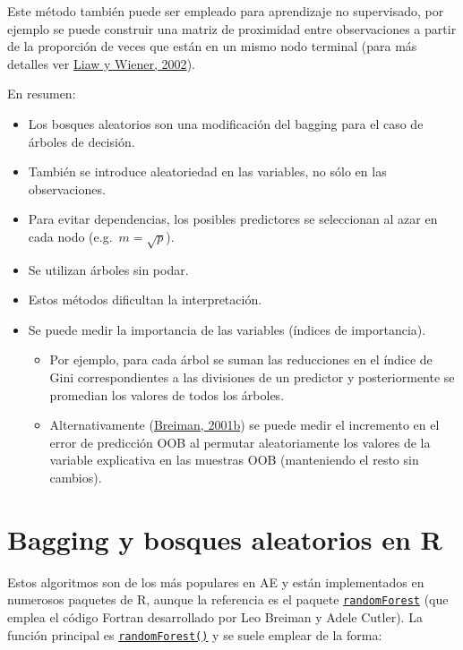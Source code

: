\documentclass[
]{book}
\theoremstyle{break}
\theoremstyle{nonumberplain}
\begin{document}
Este método también puede ser empleado para aprendizaje no supervisado,
por ejemplo se puede construir una matriz de proximidad entre observaciones a partir de la proporción de veces que están en un mismo nodo terminal (para más detalles ver \protect\hyperlink{ref-liaw2002classification}{Liaw y Wiener, 2002}).

En resumen:

\begin{itemize}
\item
  Los bosques aleatorios son una modificación del bagging para el caso de árboles de decisión.
\item
  También se introduce aleatoriedad en las variables, no sólo en las observaciones.
\item
  Para evitar dependencias, los posibles predictores se seleccionan al azar en cada nodo (e.g.~\(m=\sqrt{p}\)).
\item
  Se utilizan árboles sin podar.
\item
  Estos métodos dificultan la interpretación.
\item
  Se puede medir la importancia de las variables (índices de importancia).

  \begin{itemize}
  \item
    Por ejemplo, para cada árbol se suman las reducciones en el
    índice de Gini correspondientes a las divisiones de un
    predictor y posteriormente se promedian los valores de todos
    los árboles.
  \item
    Alternativamente (\protect\hyperlink{ref-breiman2001statistical}{Breiman, 2001b}) se puede medir el incremento en el error de
    predicción OOB al permutar aleatoriamente los valores de la
    variable explicativa en las muestras OOB (manteniendo el resto
    sin cambios).
  \end{itemize}
\end{itemize}

\hypertarget{bagging-rf-r}{%
\section{Bagging y bosques aleatorios en R}\label{bagging-rf-r}}

Estos algoritmos son de los más populares en AE y están implementados en numerosos paquetes de R, aunque la referencia es el paquete \href{https://CRAN.R-project.org/package=randomForest}{\texttt{randomForest}} (que emplea el código Fortran desarrollado por Leo Breiman y Adele Cutler).
La función principal es \href{https://rdrr.io/pkg/randomForest/man/randomForest.html}{\texttt{randomForest()}} y se suele emplear de la forma:
\end{document}
